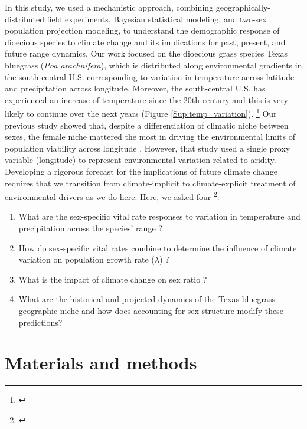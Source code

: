 \documentclass[12pt]{article}
\newcommand{\jacob}[2]{{\color{blue}{#1}}\footnote{\textit{\color{blue}{#2}}}}
\begin{document}
In this study, we used a mechanistic approach, combining geographically-distributed field experiments, Bayesian statistical modeling, and two-sex population projection modeling, to understand the demographic response of dioecious species to climate change and its implications for past, present, and future range dynamics. 
Our work focused on the dioecious grass species Texas bluegrass (\textit{Poa arachnifera}), which is distributed along environmental gradients in the south-central U.S. corresponding to variation in temperature across latitude and precipitation across longitude. 
Moreover, the south-central U.S. has experienced an increase of temperature since the 20th century and this is very likely to continue over the next years (Figure \ref{Sup:temp_variation}).  
\jacob{}{I added some context about climate change in this study region}
Our previous study showed that, despite a differentiation of climatic niche between sexes, the female niche mattered the most in driving the environmental limits of population viability across longitude \citep{miller2022two}. 
However, that study used a single proxy variable (longitude) to represent environmental variation related to aridity. 
Developing a rigorous forecast for the implications of future climate change requires that we transition from climate-implicit to climate-explicit treatment of environmental drivers as we do here.
Here, we asked four \jacob{questions}{I changed the order of the questions and added a new question that will add value to our paper. }: 
\begin{enumerate}
	\item What are the sex-specific vital rate responses to variation in temperature and precipitation across the species' range ?
	\item How do sex-specific vital rates combine to determine the influence of climate variation on population growth rate ($\lambda$) ?
	\item What is the impact of climate change on sex ratio ?
	\item What are the historical and projected dynamics of the Texas bluegrass geographic niche and how does accounting for sex structure modify these predictions?
\end{enumerate}

\section*{Materials and methods}
\end{document}
